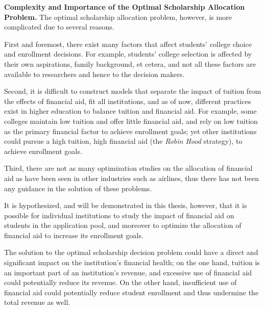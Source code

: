 \documentclass[12pt,english]{report}
\begin{document}
\vspace*{.15in} 
\noindent \textbf{Complexity and Importance of the Optimal Scholarship Allocation Problem.}
The optimal scholarship allocation problem, however, is more complicated due to several reasons. 

First and foremost, there exist many factors that affect students' college choice and enrollment decisions. For example, students' college selection is affected by their own aspirations, family background, et cetera, and not all these factors are available to researchers and hence to the decision makers. %

Second, it is difficult to construct models that separate the impact of tuition from the effects of financial aid, fit all institutions, and as of now, different practices exist in higher education to balance tuition and financial aid. For example, some colleges maintain low tuition and offer little financial aid, and rely on low tuition as the primary financial factor to achieve enrollment goals; yet other institutions could pursue a high tuition, high financial aid (the \textit{Robin Hood} strategy), to achieve enrollment goals.

Third, there are not as many optimization studies on the allocation of financial aid as have been seen in other industries such as airlines, thus there has not been any guidance in the solution of these problems. 

\vspace*{.15in}  
It is hypothesized, and will be demonstrated in this thesis, however, that it is possible for individual institutions  to study the impact of financial aid on students in the application pool, and moreover to optimize the allocation of financial aid to increase its enrollment goals. 

The solution to the optimal scholarship decision problem could have a direct and significant impact on the institution's financial health; on the one hand, tuition is an important part of an institution's revenue, and excessive use of financial aid could potentially reduce its revenue. On the other hand, insufficient use of financial aid could potentially reduce student enrollment and thus undermine the total revenue as well. 
\end{document}
